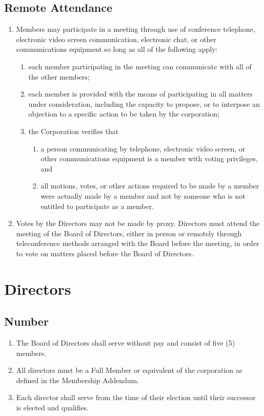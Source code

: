 \documentclass{article}
\begin{document}
\subsection{Remote Attendance}
\begin{enumerate}
    \item Members may participate in a meeting through use of conference
    telephone, electronic video screen communication, electronic chat, or other
    communications equipment so long as all of the following apply:
    \begin{enumerate}
        \item each member participating in the meeting can communicate with all
        of the other members;
        \item each member is provided with the means of participating in all
        matters under consideration, including the capacity to propose, or to
        interpose an objection to a specific action to be taken by the
        corporation;
        \item the Corporation verifies that
        \begin{enumerate}
            \item a person communicating by telephone, electronic video screen,
        or other communications equipment is a member with voting privileges,
        and
            \item all motions, votes, or other actions required to be made by a
        member were actually made by a member and not by someone who is not
        entitled to participate as a member.
        \end{enumerate}
    \end{enumerate}
    \item Votes by the Directors may not be made by proxy. Directors must attend
    the meeting of the Board of Directors, either in person or remotely through
    teleconference methods arranged with the Board before the meeting, in order
    to vote on matters placed before the Board of Directors.
\end{enumerate}

\section{Directors}
\subsection{Number}
\begin{enumerate}
  \item The Board of Directors shall serve without pay and consist of five (5)
  members.
  \item All directors must be a Full Member or equivalent of the corporation as
  defined in the Membership Addendum.
  \item Each director shall serve from the time of their election until their
  successor is elected and qualifies.
\end{enumerate}
\end{document}
